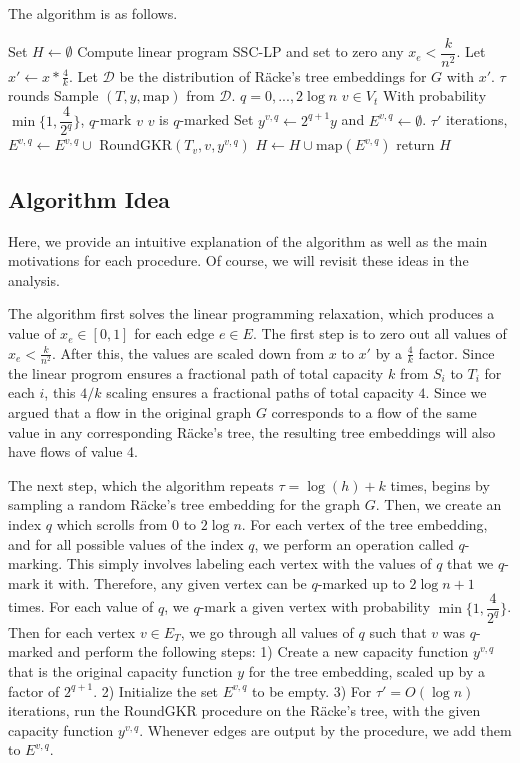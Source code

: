 \documentclass[12pt]{article}
\begin{document}
The algorithm is as follows.

\begin{codebox}
\li Set $H \leftarrow \emptyset$
\li Compute linear program SSC-LP and set to zero any $x_e < \dfrac{k}{n^2}$.
\li Let $x' \leftarrow x*\frac{4}{k}$. 
\li Let $\mathcal{D}$ be the distribution of R\"{a}cke's tree embeddings for $G$ with $x'$.
\li \For $\tau$ rounds \Do
\li Sample $(T, y, \text{map})$ from $\mathcal{D}$. 
\li \For $q = 0, ..., 2\log n$ \Do
\li \For $v \in V_t$ \Do
\li With probability $\min\{1, \dfrac{4}{2^q}\}$, $q$-mark $v$
\li \If $v$ is $q$-marked \Then
\li Set $y^{v, q}\leftarrow 2^{q+1}y$ and $E^{v,q} \leftarrow \emptyset$.
\li \For $\tau'$ iterations, \Do
\li $E^{v,q} \leftarrow E^{v,q} \cup$ RoundGKR$(T_v, v, y^{v,q})$ \End
\li $H \leftarrow H \cup \text{map}(E^{v,q})$ \End \End \End \End
\li return $H$
\end{codebox}

\subsection{Algorithm Idea}

Here, we provide an intuitive explanation of the algorithm as well as the main motivations for each procedure. Of course, we will revisit these ideas in the analysis.

The algorithm first solves the linear programming relaxation, which produces a value of $x_e \in [0,1]$ for each edge $e \in E$. The first step is to zero out all values of $x_e < \frac{k}{n^2}$. After this, the values are scaled down from $x$ to $x'$ by a $\frac{4}{k}$ factor. Since the linear progrom ensures a fractional path of total capacity $k$ from $S_i$ to $T_i$ for each $i$, this $4/k$ scaling ensures a fractional paths of total capacity $4$. Since we argued that a flow in the original graph $G$ corresponds to a flow of the same value in any corresponding R\"{a}cke's tree, the resulting tree embeddings will also have flows of value 4. 

The next step, which the algorithm repeats $\tau = \log(h) + k$ times, begins by sampling a random R\"{a}cke's tree embedding for the graph $G$. Then, we create an index $q$ which scrolls from 0 to $2\log n$. For each vertex of the tree embedding, and for all possible values of the index $q$, we perform an operation called $q$-marking. This simply involves labeling each vertex with the values of $q$ that we $q$-mark it with. Therefore, any given vertex can be $q$-marked up to $2\log n + 1$ times. For each value of $q$, we $q$-mark a given vertex with probability $\min\{1, \dfrac{4}{2^q}\}$. Then for each vertex $v \in E_T$, we go through all values of $q$ such that $v$ was $q$-marked and perform the following steps: 1) Create a new capacity function $y^{v,q}$ that is the original capacity function $y$ for the tree embedding, scaled up by a factor of $2^{q+1}$. 2) Initialize the set $E^{v,q}$ to be empty. 3) For $\tau' = O(\log n)$ iterations, run the RoundGKR procedure on the R\"{a}cke's tree, with the given capacity function $y^{v,q}$. Whenever edges are output by the procedure, we add them to $E^{v,q}$.
\end{document}
